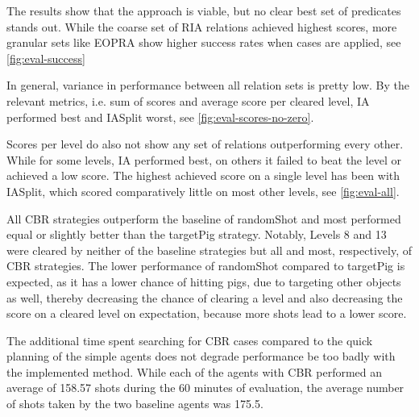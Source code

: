 The results show that the approach is viable, but no clear best set of predicates stands out. While the coarse set of \ac{RIA} relations achieved highest scores, more granular sets like \ac{EOPRA} show higher success rates when cases are applied, see \ref{fig:eval-success}


In general, variance in performance between all relation sets is pretty low. By the relevant metrics, i.e. sum of scores and average score per cleared level,  \ac{IA} performed best and \ac{IASplit} worst, see \ref{fig:eval-scores-no-zero}.

Scores per level do also not show any set of relations outperforming every other. While for some levels, \ac{IA} performed best, on others it failed to beat the level or achieved a low score. The highest achieved score on a single level has been with \ac{IASplit}, which scored comparatively little on most other levels, see \ref{fig:eval-all}.

All \ac{CBR} strategies outperform the baseline of randomShot and most performed equal or slightly better than the targetPig strategy. Notably, Levels 8 and 13 were cleared by neither of the baseline strategies but all and most, respectively, of \ac{CBR} strategies.
The lower performance of randomShot compared to targetPig is expected, as it has a lower chance of hitting pigs, due to targeting other objects as well, thereby decreasing the chance of clearing a level and also decreasing the score on a cleared level on expectation, because more shots lead to a lower score.


The additional time spent searching for CBR cases compared to the quick planning of the simple agents does not degrade performance be too badly with the implemented method. While each of the agents with \ac{CBR} performed an average of 158.57 shots during the 60 minutes of evaluation, the average number of shots taken by the two baseline agents was 175.5.